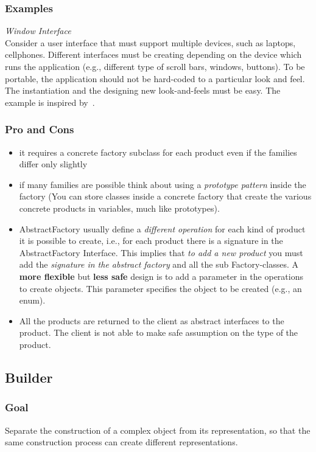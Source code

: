 \documentclass{article}
\begin{document}
\subsubsection{Examples}
\emph{Window Interface}\\
Consider a user interface that must support multiple devices, such as laptops, cellphones. Different interfaces must be creating depending on the device which runs the application (e.g., different type of scroll bars, windows, buttons). To be portable, the application should not be hard-coded to a particular look and feel. The instantiation and the designing new look-and-feels must be easy. The example is inspired by~\cite{gamma1994design}.



\subsubsection{Pro and Cons}
\begin{itemize}
\item it requires a concrete factory subclass for each product even if the families differ only slightly
\item if many families are possible think about using a \emph{prototype pattern} inside the factory (You can store classes inside a concrete factory that create the various concrete products in variables, much like prototypes).
\item AbstractFactory usually define a \emph{different operation} for each kind of product it is possible to create, i.e., for each product there is a signature in the AbstractFactory Interface. This implies that \emph{to add a new product} you must add the \emph{signature in the abstract factory} and all the sub Factory-classes. A \textbf{more flexible} but \textbf{less safe} design is to add a parameter in the operations to create objects. This parameter specifies the object to be created (e.g., an enum).
\item All the products are returned to the client as abstract interfaces to the product. The client is not able to make safe assumption on the type of the product.
\end{itemize}



\subsection{Builder}
\subsubsection{Goal}
Separate the construction of a complex object from its representation, so that the same construction process can create different representations.
\end{document}
